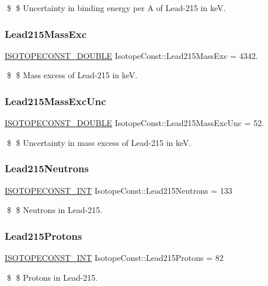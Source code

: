 \$ \$ Uncertainty in binding energy per A of Lead-\/215 in keV. \mbox{\label{group___isotope_const-_lead-_pb215_ga0d3ffe99583c91a6e7723ec40b4972db}} 
\subsubsection{\texorpdfstring{Lead215\+Mass\+Exc}{Lead215MassExc}}
{\footnotesize\ttfamily \mbox{\hyperlink{group___isotope_const-_macros_ga8f45a7272ce02c0b4c65c44636ed719a}{I\+S\+O\+T\+O\+P\+E\+C\+O\+N\+S\+T\+\_\+\+D\+O\+U\+B\+LE}} Isotope\+Const\+::\+Lead215\+Mass\+Exc = 4342.}

\$ \$ Mass excess of Lead-\/215 in keV. \mbox{\label{group___isotope_const-_lead-_pb215_ga1a59d2d454a7f018c0a2e0c2e9377e04}} 
\subsubsection{\texorpdfstring{Lead215\+Mass\+Exc\+Unc}{Lead215MassExcUnc}}
{\footnotesize\ttfamily \mbox{\hyperlink{group___isotope_const-_macros_ga8f45a7272ce02c0b4c65c44636ed719a}{I\+S\+O\+T\+O\+P\+E\+C\+O\+N\+S\+T\+\_\+\+D\+O\+U\+B\+LE}} Isotope\+Const\+::\+Lead215\+Mass\+Exc\+Unc = 52.}

\$ \$ Uncertainty in mass excess of Lead-\/215 in keV. \mbox{\label{group___isotope_const-_lead-_pb215_ga8fe09f662765b28c8a13d7430e8fd4ed}} 
\subsubsection{\texorpdfstring{Lead215\+Neutrons}{Lead215Neutrons}}
{\footnotesize\ttfamily \mbox{\hyperlink{group___isotope_const-_macros_ga5f18360b3e99483a35c32d789e62621c}{I\+S\+O\+T\+O\+P\+E\+C\+O\+N\+S\+T\+\_\+\+I\+NT}} Isotope\+Const\+::\+Lead215\+Neutrons = 133}

\$ \$ Neutrons in Lead-\/215. \mbox{\label{group___isotope_const-_lead-_pb215_gabae89f3739b099bad7d963e08295a523}} 
\subsubsection{\texorpdfstring{Lead215\+Protons}{Lead215Protons}}
{\footnotesize\ttfamily \mbox{\hyperlink{group___isotope_const-_macros_ga5f18360b3e99483a35c32d789e62621c}{I\+S\+O\+T\+O\+P\+E\+C\+O\+N\+S\+T\+\_\+\+I\+NT}} Isotope\+Const\+::\+Lead215\+Protons = 82}

\$ \$ Protons in Lead-\/215. 